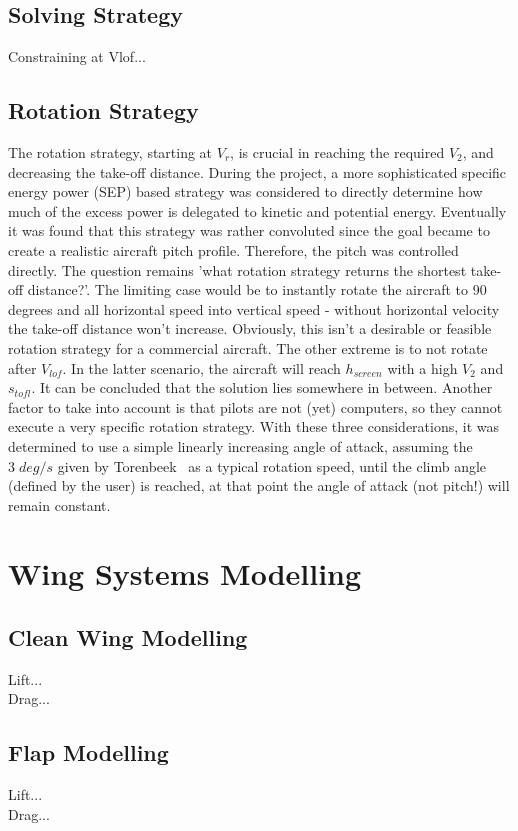 \subsection{Solving Strategy}
Constraining at Vlof...

\subsection{Rotation Strategy}\label{sec:rotation}
The rotation strategy, starting at $V_r$, is crucial in reaching the required $V_2$, and decreasing the take-off distance. During the project, a more sophisticated specific energy power (SEP) based strategy was considered to directly determine how much of the excess power is delegated to kinetic and potential energy. Eventually it was found that this strategy was rather convoluted since the goal became to create a realistic aircraft pitch profile. Therefore, the pitch was controlled directly. The question remains 'what rotation strategy returns the shortest take-off distance?'. The limiting case would be to instantly rotate the aircraft to 90 degrees and all horizontal speed into vertical speed - without horizontal velocity the take-off distance won't increase. Obviously, this isn't a desirable or feasible rotation strategy for a commercial aircraft. The other extreme is to not rotate after $V_{lof}$. In the latter scenario, the aircraft will reach $h_{screen}$ with a high $V_2$ and $s_{tofl}$. It can be concluded that the solution lies somewhere in between. Another factor to take into account is that pilots are not (yet) computers, so they cannot execute a very specific rotation strategy. With these three considerations, it was determined to use a simple linearly increasing angle of attack, assuming the $3\;deg/s$ given by Torenbeek~\cite{torenbeek2013synthesis} as a typical rotation speed, until the climb angle (defined by the user) is reached, at that point the angle of attack (not pitch!) will remain constant.

\section{Wing Systems Modelling}

\subsection{Clean Wing Modelling}
Lift...\\
Drag...

\subsection{Flap Modelling}
Lift...\\
Drag...

